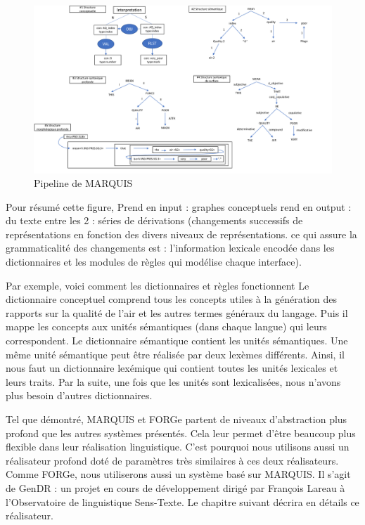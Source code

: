 \begin{figure}[htb]
	\centering
	\includegraphics[width=1\textwidth, trim = {0cm 0cm 0cm 0cm},clip]{ch2/figs/marquis.pdf}
	\caption{Pipeline de MARQUIS}
	\label{fig:marquis}
\end{figure}

Pour résumé cette figure,
Prend en input : graphes conceptuels 
rend en output : du texte
entre les 2 : séries de dérivations (changements successifs de représentations en fonction des divers niveaux de représentations. ce qui assure la grammaticalité des changements est : l'information lexicale encodée dans les dictionnaires et les modules de règles qui modélise chaque interface).

Par exemple, voici comment les dictionnaires et règles fonctionnent 
Le dictionnaire conceptuel comprend tous les concepts utiles à la génération des rapports sur la qualité de l'air et les autres termes généraux du langage. Puis il mappe les concepts aux unités sémantiques (dans chaque langue) qui leurs correspondent. Le dictionnaire sémantique contient les unités sémantiques. Une même unité sémantique peut être réalisée par deux lexèmes différents. Ainsi, il nous faut un dictionnaire lexémique qui contient toutes les unités lexicales et leurs traits. Par la suite, une fois que les unités sont lexicalisées, nous n'avons plus besoin d'autres dictionnaires. 

Tel que démontré, MARQUIS et FORGe partent de niveaux d'abstraction plus profond que les autres systèmes présentés. Cela leur permet d'être beaucoup plus flexible dans leur réalisation linguistique. C'est pourquoi nous utilisons aussi un réalisateur profond doté de paramètres très similaires à ces deux réalisateurs. Comme FORGe, nous utiliserons aussi un système basé sur MARQUIS. Il s'agit de GenDR \citep{lareau18}: un projet en cours de développement dirigé par François Lareau à l’Observatoire de linguistique Sens-Texte. Le chapitre suivant décrira en détails ce réalisateur.